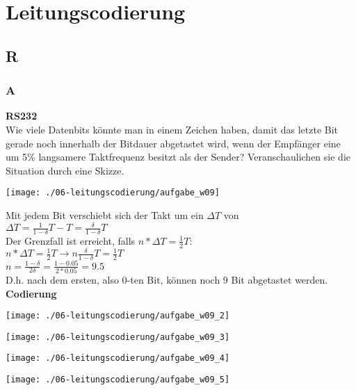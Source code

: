 

\section{Leitungscodierung}
\subsection{R}
\subsubsection{A}
\textbf{RS232}\\
Wie viele Datenbits könnte man in einem Zeichen haben, damit das letzte Bit gerade noch innerhalb der Bitdauer abgetastet wird, wenn der Empfänger eine um 5\% langsamere Taktfrequenz besitzt als der Sender? Veranschaulichen sie die Situation durch eine Skizze.
\begin{center}
    \vspace{-8pt}
    \texttt{[image: ./06-leitungscodierung/aufgabe\_w09]}
    \vspace{-8pt}
\end{center}

Mit jedem Bit verschiebt sich der Takt um ein $\Delta T$ von\\
$\Delta T=\frac{1}{1-\delta }T-T=\frac{\delta}{1-\delta}T$\\
Der Grenzfall ist erreicht, falls $n*\Delta T = \frac{1}{2}T:$\\
$n*\Delta T = \frac{1}{2}T \rightarrow n\frac{\delta}{1-\delta}T=\frac{1}{2}T$\\
$n=\frac{1-\delta}{2\delta}=\frac{1-0.05}{2*0.05}=9.5$\\
D.h. nach dem ersten, also 0-ten Bit, können noch 9 Bit abgetastet werden.\\

\textbf{Codierung}\\
\begin{center}
    \vspace{-8pt}
    \texttt{[image: ./06-leitungscodierung/aufgabe\_w09\_2]}
    \vspace{-8pt}
\end{center}
\begin{center}
    \vspace{-8pt}
    \texttt{[image: ./06-leitungscodierung/aufgabe\_w09\_3]}
    \vspace{-8pt}
\end{center}
\begin{center}
    \vspace{-8pt}
    \texttt{[image: ./06-leitungscodierung/aufgabe\_w09\_4]}
    \vspace{-8pt}
\end{center}
\begin{center}
    \vspace{-8pt}
    \texttt{[image: ./06-leitungscodierung/aufgabe\_w09\_5]}
    \vspace{-8pt}
\end{center}


